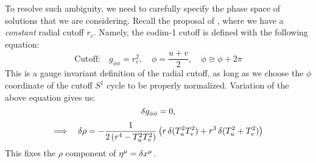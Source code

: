 \documentclass[12pt,a4paper,utf8]{article}
\begin{document}
	To resolve such ambiguity, we need to carefully specify the phase space of solutions that we are considering. 
	Recall the proposal of \cite{McGough:2016lol}, where we have a \textit{constant} radial cutoff $r_c$. Namely, the codim-1 cutoff is defined with the following equation:
	\begin{equation}
	\text{Cutoff:}\quad
		g_{\phi\phi}%
		= r_c^2,
	\quad
		\phi = \frac{u + v}{2},
	\quad
		\phi \cong \phi + 2\pi
	\label{eq:cutoff_surface}
	\end{equation}
	This is a gauge invariant definition of the radial cutoff, as long as we choose the $\phi$ coordinate of the cutoff $S^1$ cycle to be properly normalized. Variation of the above equation gives us:
	\begin{equation}
		\mathinner{\delta g_{\phi\phi}} = 0,
	\end{equation}
	\begin{equation}
	\Longrightarrow\quad
		\mathinner{\delta \rho}
		= -\frac{1}{2\,(r^4 - T_u^2 T_v^2)}
			\left(
				r \mathinner{\delta (T_u^2 T_v^2)}
				+ r^3 \mathinner{\delta (T_u^2 + T_v^2)}
			\right)
	\end{equation}
	This fixes the $\rho$ component of $\eta^\mu = \mathinner{\delta x^\mu}$. 
	
\end{document}
